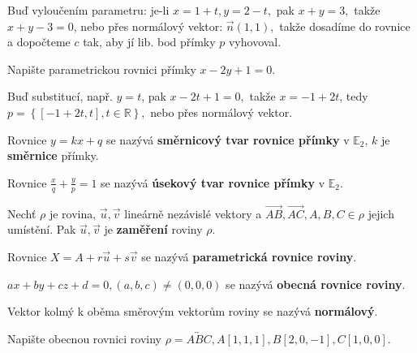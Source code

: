 \begin{reseni}
Buď vyloučením parametru: je-li $x=1+t, y= 2-t,$ pak $x+y=3,$ takže $x+y-3=0$, nebo
přes normálový vektor: $\vec n(1,1),$ takže dosadíme do rovnice a dopočteme $c$ tak,
aby jí lib. bod přímky $p$ vyhovoval.
\end{reseni}

\begin{priklad}
Napište parametrickou rovnici přímky $x-2y+1=0.$
\end{priklad}

\begin{reseni}
Buď substitucí, např. $y=t$, pak $x-2t+1=0,$ takže $x=-1+2t$, tedy $p=\left \{ [-1+2t,t], t \in \mathbb R \right \}, $
nebo přes normálový vektor.
\end{reseni}

\begin{definition}
    Rovnice $y=kx+q$ se nazývá \textbf{směrnicový tvar rovnice přímky} v $\mathbb E_2$,
    $k$ je \textbf{směrnice} přímky.
\end{definition}

\begin{definition}
Rovnice $\frac{x}{q}+\frac{y}{p}=1$ se nazývá \textbf{úsekový tvar rovnice přímky} v $\mathbb E_2$.
\end{definition}

\begin{definition}
Nechť $\rho$ je rovina, $\vec u, \vec v$ lineárně nezávislé vektory a $\overrightarrow{AB},
\overrightarrow{AC}, A,B,C\in \rho$ jejich umístění. Pak $\vec u, \vec v$ je
\textbf{zaměření} roviny $\rho.$
\end{definition}

\begin{definition}
    Rovnice $X=A+r\vec u+s\vec v$ se nazývá \textbf{parametrická rovnice roviny}.
\end{definition}

\begin{definition}
    $ax+by+cz+d=0, (a,b,c)\ne(0,0,0)$ se nazývá \textbf{obecná rovnice roviny}.
\end{definition}

\begin{definition}
    Vektor kolmý k oběma směrovým vektorům roviny se nazývá \textbf{normálový}.
\end{definition}

\begin{priklad}
Napište obecnou rovnici roviny $\rho = \overleftrightarrow{ABC}, A[1,1,1], B[2,0,-1], C[1,0,0].$
\end{priklad}

